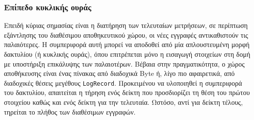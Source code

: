 \subsubsection{Επίπεδο κυκλικής ουράς}

Επειδή κύριας σημασίας είναι η διατήρηση των τελευταίων μετρήσεων, σε περίπτωση
εξάντλησης του διαθέσιμου αποθηκευτικού χώρου, οι νέες εγγραφές αντικαθιστούν
τις παλαιότερες. Η συμπεριφορά αυτή μπορεί να αποδοθεί από μία απλουστευμένη
μορφή δακτυλίου (ή κυκλικής ουράς), όπου επιτρέπεται μόνο η εισαγωγή στοιχείων
στη δομή με υποστήριξη επικάλυψης των παλαιοτέρων. Βέβαια στην πραγματικότητα, ο
χώρος αποθήκευσης είναι ένας πίνακας από διαδοχικά Byte ή, λίγο πιο αφαιρετικά,
από διαδοχικές θέσεις μεγέθους \verb~LogRecord~. Προκειμένου να υλοποιηθεί η
συμπεριφορά του δακτυλίου, απαιτείται η τήρηση ενός δείκτη που προσδιορίζει τη
θέση του πρώτου στοιχείου καθώς και ενός δείκτη για την τελευταία. Ωστόσο, αντί
για δείκτη τέλους, τηρείται το πλήθος των διαθέσιμων εγγραφών.
